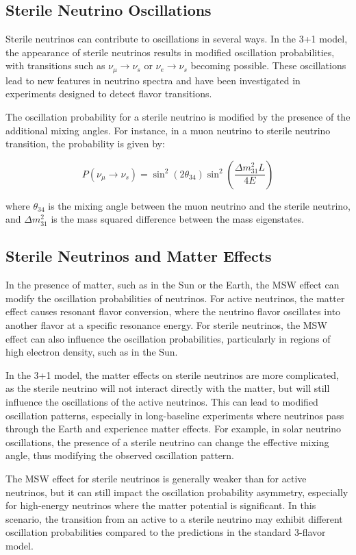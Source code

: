 \documentclass[a4paper,12pt,numbered]{article}
\begin{document}
\subsection{Sterile Neutrino Oscillations}

Sterile neutrinos can contribute to oscillations in several ways. In the 3+1 model, the appearance of sterile neutrinos results in modified oscillation probabilities, with transitions such as \( \nu_\mu \to \nu_s \) or \( \nu_e \to \nu_s \) becoming possible. These oscillations lead to new features in neutrino spectra and have been investigated in experiments designed to detect flavor transitions.

The oscillation probability for a sterile neutrino is modified by the presence of the additional mixing angles. For instance, in a muon neutrino to sterile neutrino transition, the probability is given by:

\[
P(\nu_\mu \to \nu_s) = \sin^2(2\theta_{34}) \sin^2 \left( \frac{\Delta m^2_{31} L}{4E} \right)
\]

where \( \theta_{34} \) is the mixing angle between the muon neutrino and the sterile neutrino, and \( \Delta m^2_{31} \) is the mass squared difference between the mass eigenstates.

\subsection{Sterile Neutrinos and Matter Effects}

In the presence of matter, such as in the Sun or the Earth, the MSW effect can modify the oscillation probabilities of neutrinos. For active neutrinos, the matter effect causes resonant flavor conversion, where the neutrino flavor oscillates into another flavor at a specific resonance energy. For sterile neutrinos, the MSW effect can also influence the oscillation probabilities, particularly in regions of high electron density, such as in the Sun. 

In the 3+1 model, the matter effects on sterile neutrinos are more complicated, as the sterile neutrino will not interact directly with the matter, but will still influence the oscillations of the active neutrinos. This can lead to modified oscillation patterns, especially in long-baseline experiments where neutrinos pass through the Earth and experience matter effects. For example, in solar neutrino oscillations, the presence of a sterile neutrino can change the effective mixing angle, thus modifying the observed oscillation pattern.

The MSW effect for sterile neutrinos is generally weaker than for active neutrinos, but it can still impact the oscillation probability asymmetry, especially for high-energy neutrinos where the matter potential is significant. In this scenario, the transition from an active to a sterile neutrino may exhibit different oscillation probabilities compared to the predictions in the standard 3-flavor model.




\end{document}
